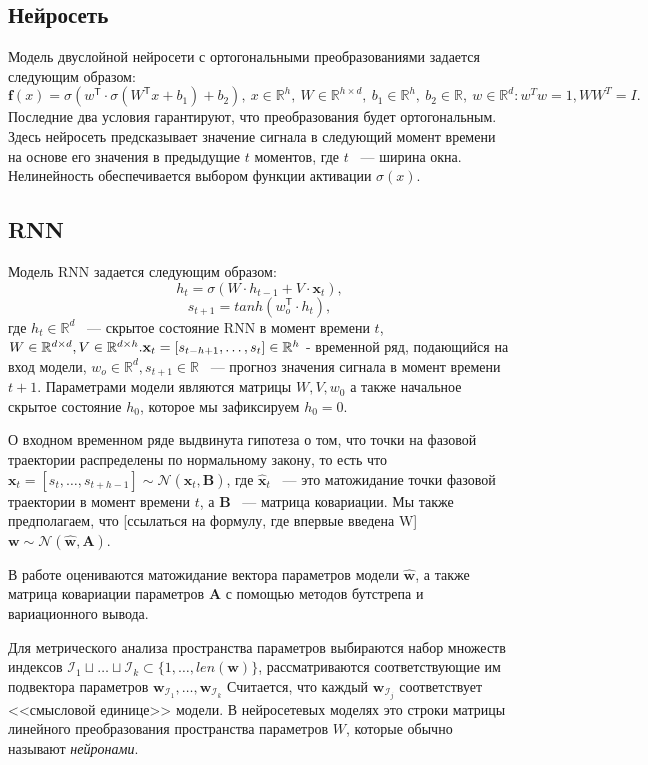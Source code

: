 \documentclass[12pt, twoside]{article}
\begin{document}
\subsection{Нейросеть}
Модель двуслойной нейросети с ортогональными преобразованиями задается следующим образом: \[\mathbf{f}(x) = \sigma(w^{\mathsf{T}}\cdot \sigma(W^{\mathsf{T}}x + b_1) + b_2), \ x \in \mathbb{R}^{h}, \ W \in \mathbb{R}^{h \times d}, \ b_1 \in \mathbb{R}^h, \ b_2 \in \mathbb{R}, \ w \in \mathbb{R}^d: w^Tw=1, WW^T=I.\] Последние два условия гарантируют, что преобразования будет ортогональным. Здесь нейросеть предсказывает значение сигнала в следующий момент времени на основе его значения в предыдущие $t$ моментов, где $t$ ~--- ширина окна. Нелинейность обеспечивается выбором функции активации $\sigma(x)$.


\subsection{RNN}
Модель RNN задается следующим образом: \[ h_t = \sigma(W \cdot h_{t-1} + V \cdot \mathbf{x}_t),\]
\[ s_{t+1} = tanh(w_o^{\mathsf{T}} \cdot h_t), \] где $h_{t} \in \mathbb{R}^{d}$ ~--- скрытое состояние RNN в момент времени $t$, $W \in \mathbb{R}^{d \times d}, V \in \mathbb{R}^{d \times h}. \\
\mathbf{x}_t = [s_{t - h + 1}, \dots, s_{t}] \in \mathbb{R}^h$ - временной ряд, подающийся на вход модели, $w_o \in \mathbb{R}^{d}, s_{t+1} \in \mathbb{R}$ ~--- прогноз значения сигнала в момент времени $t+1$. Параметрами модели являются матрицы $W, V, w_0$ а также начальное скрытое состояние $h_0$, которое мы зафиксируем $h_0=0$.

О входном временном ряде выдвинута гипотеза о том, что точки на фазовой траектории распределены по нормальному закону, то есть что $\mathbf{x}_t = [s_t, \dots, s_{t + h - 1}] \sim \mathcal{N}(\hat{\mathbf{x}}_t, \mathbf{B})$, где $\hat{\mathbf{x}}_t$ ~--- это матожидание точки фазовой траектории в момент времени $t$, а $\mathbf{B}$ ~--- матрица ковариации. Мы также предполагаем, что [ссылаться на формулу, где впервые введена W]$\mathbf{w} \sim \mathcal{N}(\hat{\mathbf{w}}, \mathbf{A})$. 

В работе оцениваются матожидание вектора параметров модели $\hat{\mathbf{w}}$, а также матрица ковариации параметров $\mathbf{A}$ с помощью методов бутстрепа и вариационного вывода.

Для метрического анализа пространства параметров выбираются набор множеств индексов $\mathcal{I}_1 \sqcup \dots \sqcup \mathcal{I}_k \subset \{1, \dots, len(\mathbf{w})\}$, рассматриваются соответствующие им подвектора параметров $\mathbf{w}_{\mathcal{I}_1}, \dots, \mathbf{w}_{\mathcal{I}_k}$
Считается, что каждый $\mathbf{w}_{\mathcal{I}_j}$ соответствует <<смысловой единице>> модели. В нейросетевых моделях это строки матрицы линейного преобразования пространства параметров $W$, которые обычно называют \textit{нейронами}.
\end{document}
